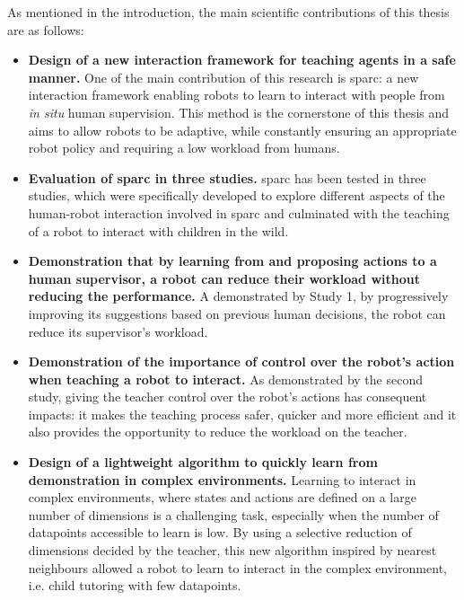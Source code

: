 As mentioned in the introduction, the main scientific contributions of this thesis are as follows:
\begin{itemize}
	\item \textbf{Design of a new interaction framework for teaching agents in a safe manner.} One of the main contribution of this research is \gls{sparc}: a new interaction framework enabling robots to learn to interact with people from \textit{in situ} human supervision. This method is the cornerstone of this thesis and aims to allow robots to be adaptive, while constantly ensuring an appropriate robot policy and requiring a low workload from humans.
	
	\item \textbf{Evaluation of \gls{sparc} in three studies.} \gls{sparc} has been tested in three studies, which were specifically developed to explore different aspects of the human-robot interaction involved in \gls{sparc} and culminated with the teaching of a robot to interact with children in the wild.
	
	\item \textbf{Demonstration that by learning from and proposing actions to a human supervisor, a robot can reduce their workload without reducing the performance.} A demonstrated by Study 1, by progressively improving its suggestions based on previous human decisions, the robot can reduce its supervisor's workload.
	
	\item \textbf{Demonstration of the importance of control over the robot's action when teaching a robot to interact.} As demonstrated by the second study, giving the teacher control over the robot's actions has consequent impacts: it makes the teaching process safer, quicker and more efficient and it also provides the opportunity to reduce the workload on the teacher.
	
	\item \textbf{Design of a lightweight algorithm to quickly learn from demonstration in complex environments.} Learning to interact in complex environments, where states and actions are defined on a large number of dimensions is a challenging task, especially when the number of datapoints accessible to learn is low. By using a selective reduction of dimensions decided by the teacher, this new algorithm inspired by nearest neighbours allowed a robot to learn to interact in the complex environment, i.e. child tutoring with few datapoints. 
	

\end{itemize}
